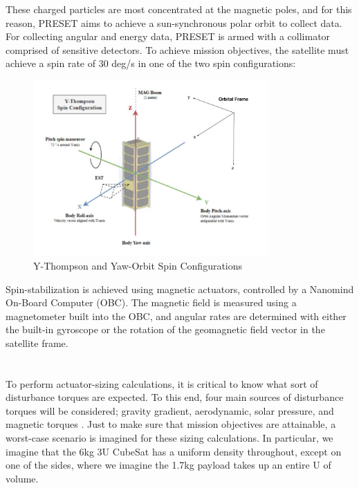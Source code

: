 \documentclass{article}
\begin{document}
These charged particles are most concentrated at the magnetic poles, and for this reason, PRESET aims to achieve a sun-synchronous polar orbit to collect data. For collecting angular and energy data, PRESET is armed with a collimator comprised of sensitive detectors. To achieve mission objectives, the satellite must achieve a spin rate of 30 deg/s in one of the two spin configurations:

\begin{figure}[H]
    \centering
    \includegraphics[width=0.8\textwidth]{Y-Thompson w Orbital Frame Labelled.jpg}
    \caption{Y-Thompson and Yaw-Orbit Spin Configurations}
    \label{fig:enter-label}
\end{figure}

Spin-stabilization is achieved using magnetic actuators, controlled by a Nanomind On-Board Computer (OBC). The magnetic field is measured using a magnetometer built into the OBC, and angular rates are determined with either the built-in gyroscope or the rotation of the geomagnetic field vector in the satellite frame.

\newpage

\section{\color{black}{Quantifying the Disturbance Environment}}

To perform actuator-sizing calculations, it is critical to know what sort of disturbance torques are expected. To this end, four main sources of disturbance torques will be considered; gravity gradient, aerodynamic, solar pressure, and magnetic torques \cite{SMAD}. Just to make sure that mission objectives are attainable, a worst-case scenario is imagined for these sizing calculations. In particular, we imagine that the 6kg 3U CubeSat has a uniform density throughout, except on one of the sides, where we imagine the 1.7kg payload takes up an entire U of volume.
\end{document}
